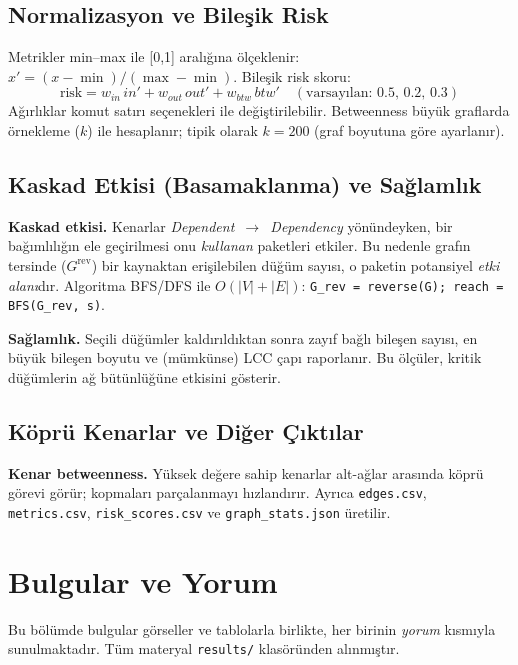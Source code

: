 \documentclass[11pt,a4paper]{article}
\begin{document}
\subsection{Normalizasyon ve Bileşik Risk}
Metrikler min–max ile [0,1] aralığına ölçeklenir: \(x' = (x-\min)/(\max-\min)\). Bileşik risk skoru:
\[
  \text{risk} = w_{in}\,in' + w_{out}\,out' + w_{btw}\,btw' \quad (\text{varsayılan: } 0.5,\,0.2,\,0.3)
\]
Ağırlıklar komut satırı seçenekleri ile değiştirilebilir. Betweenness büyük graflarda örnekleme (\(k\)) ile hesaplanır; tipik olarak \(k=200\) (graf boyutuna göre ayarlanır).

\subsection{Kaskad Etkisi (Basamaklanma) ve Sağlamlık}
\textbf{Kaskad etkisi.} Kenarlar \emph{Dependent~$\to$~Dependency} yönündeyken, bir bağımlılığın ele geçirilmesi onu \emph{kullanan} paketleri etkiler. Bu nedenle grafın tersinde (\(G^{\mathrm{rev}}\)) bir kaynaktan erişilebilen düğüm sayısı, o paketin potansiyel \emph{etki alanı}dır. Algoritma BFS/DFS ile \(O(|V|+|E|)\): \texttt{G\_rev = reverse(G); reach = BFS(G\_rev, s)}.

\textbf{Sağlamlık.} Seçili düğümler kaldırıldıktan sonra zayıf bağlı bileşen sayısı, en büyük bileşen boyutu ve (mümkünse) LCC çapı raporlanır. Bu ölçüler, kritik düğümlerin ağ bütünlüğüne etkisini gösterir.

\subsection{Köprü Kenarlar ve Diğer Çıktılar}
\textbf{Kenar betweenness.} Yüksek değere sahip kenarlar alt-ağlar arasında köprü görevi görür; kopmaları parçalanmayı hızlandırır. Ayrıca \texttt{edges.csv}, \texttt{metrics.csv}, \texttt{risk\_scores.csv} ve \texttt{graph\_stats.json} üretilir.

\section{Bulgular ve Yorum}
Bu bölümde bulgular görseller ve tablolarla birlikte, her birinin \emph{yorum} kısmıyla sunulmaktadır. Tüm materyal \texttt{results/} klasöründen alınmıştır.
\end{document}
